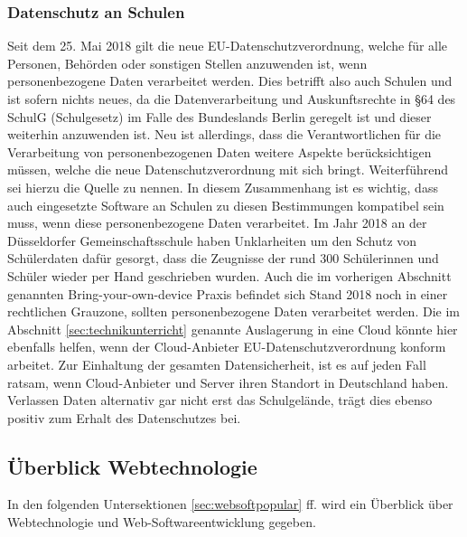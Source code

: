 \subsubsection{Datenschutz an Schulen}\label{sec:datenschutz}
Seit dem 25. Mai 2018 gilt die neue EU-Datenschutzverordnung, welche für alle Personen, Behörden oder sonstigen Stellen anzuwenden ist, wenn personenbezogene Daten verarbeitet werden. Dies betrifft also auch Schulen und ist sofern nichts neues, da die Datenverarbeitung und Auskunftsrechte in §64 des SchulG (Schulgesetz) im Falle des Bundeslands Berlin geregelt ist und dieser weiterhin anzuwenden ist. Neu ist allerdings, dass die Verantwortlichen für die Verarbeitung von personenbezogenen Daten weitere Aspekte berücksichtigen müssen, welche die neue Datenschutzverordnung mit sich bringt. Weiterführend sei hierzu die Quelle \cite[Datenschutz in der Schule]{Kachelriess2019} zu nennen. In diesem Zusammenhang ist es wichtig, dass auch eingesetzte Software an Schulen zu diesen Bestimmungen kompatibel sein muss, wenn diese personenbezogene Daten verarbeitet. Im Jahr 2018 an der Düsseldorfer Gemeinschaftsschule haben Unklarheiten um den Schutz von Schülerdaten dafür gesorgt, dass die Zeugnisse der rund 300 Schülerinnen und Schüler wieder per Hand geschrieben wurden. Auch die im vorherigen Abschnitt genannten Bring-your-own-device Praxis befindet sich Stand 2018 noch in einer rechtlichen Grauzone, sollten personenbezogene Daten verarbeitet werden\cite{WitmerGossner2018}. Die im Abschnitt \ref{sec:technikunterricht} genannte Auslagerung in eine Cloud könnte hier ebenfalls helfen, wenn der Cloud-Anbieter EU-Datenschutzverordnung konform arbeitet. Zur Einhaltung der gesamten Datensicherheit, ist es auf jeden Fall ratsam, wenn Cloud-Anbieter und Server ihren Standort in Deutschland haben.
Verlassen Daten alternativ gar nicht erst das Schulgelände, trägt dies ebenso positiv zum Erhalt des Datenschutzes bei.  
\newpage


\subsection{Überblick Webtechnologie}\label{sec:webbasedsoftware}
In den folgenden Untersektionen \ref{sec:websoftpopular} ff. wird ein Überblick über Webtechnologie und Web-Softwareentwicklung gegeben.


